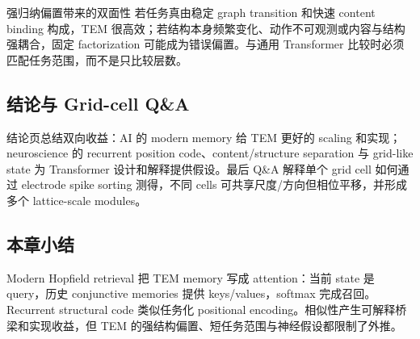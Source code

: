 
\begin{warningbox}{强归纳偏置带来的双面性}
若任务真由稳定 graph transition 和快速 content binding 构成，TEM 很高效；若结构本身频繁变化、动作不可观测或内容与结构强耦合，固定 factorization 可能成为错误偏置。与通用 Transformer 比较时必须匹配任务范围，而不是只比较层数。
\end{warningbox}

\subsection{结论与 Grid-cell Q\&A}

结论页总结双向收益：AI 的 modern memory 给 TEM 更好的 scaling 和实现；neuroscience 的 recurrent position code、content/structure separation 与 grid-like state 为 Transformer 设计和解释提供假设。最后 Q\&A 解释单个 grid cell 如何通过 electrode spike sorting 测得，不同 cells 可共享尺度/方向但相位平移，并形成多个 lattice-scale modules。



\subsection{本章小结}

Modern Hopfield retrieval 把 TEM memory 写成 attention：当前 state 是 query，历史 conjunctive memories 提供 keys/values，softmax 完成召回。Recurrent structural code 类似任务化 positional encoding。相似性产生可解释桥梁和实现收益，但 TEM 的强结构偏置、短任务范围与神经假设都限制了外推。

